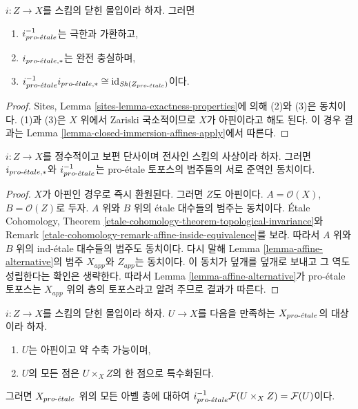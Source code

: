 \begin{lemma}
\label{lemma-closed-immersion}
$i : Z \to X$를 스킴의 닫힌 몰입이라 하자. 그러면
\begin{enumerate}
\item $i_{pro\text{-}\acute{e}tale}^{-1}$는 극한과 가환하고,
\item $i_{{pro\text{-}\acute{e}tale}, *}$는 완전 충실하며,
\item $i_{pro\text{-}\acute{e}tale}^{-1}i_{{pro\text{-}\acute{e}tale}, *} \cong
\text{id}_{\mathop{\mathit{Sh}}\nolimits(Z_{pro\text{-}\acute{e}tale})}$이다.
\end{enumerate}
\end{lemma}

\begin{proof}
Sites, Lemma \ref{sites-lemma-exactness-properties}에 의해 (2)와 (3)은
동치이다. (1)과 (3)은 $X$ 위에서 Zariski 국소적이므로 $X$가
아핀이라고 해도 된다. 이 경우 결과는 Lemma
\ref{lemma-closed-immersion-affines-apply}에서 따른다.
\end{proof}

\begin{lemma}
\label{lemma-thickening}
$i : Z \to X$를 정수적이고 보편 단사이며 전사인 스킴의 사상이라
하자. 그러면 $i_{{pro\text{-}\acute{e}tale}, *}$와 $i_{pro\text{-}\acute{e}tale}^{-1}$는 pro-\'etale
토포스의 범주들의 서로 준역인 동치이다.
\end{lemma}

\begin{proof}
$X$가 아핀인 경우로 즉시 환원된다. 그러면 $Z$도 아핀이다.
$A = \mathcal{O}(X)$, $B = \mathcal{O}(Z)$로 두자. $A$ 위와 $B$ 위의
\'etale 대수들의 범주는 동치이다. \'Etale Cohomology, Theorem
\ref{etale-cohomology-theorem-topological-invariance}와 Remark
\ref{etale-cohomology-remark-affine-inside-equivalence}를 보라.
따라서 $A$ 위와 $B$ 위의 ind-\'etale 대수들의 범주도 동치이다.
다시 말해 Lemma \ref{lemma-affine-alternative}의 범주 $X_{app}$와
$Z_{app}$는 동치이다. 이 동치가 덮개를 덮개로 보내고 그 역도
성립한다는 확인은 생략한다. 따라서 Lemma
\ref{lemma-affine-alternative}가 pro-\'etale 토포스는 $X_{app}$ 위의
층의 토포스라고 알려 주므로 결과가 따른다.
\end{proof}

\begin{lemma}
\label{lemma-compute-i-star}
$i : Z \to X$를 스킴의 닫힌 몰입이라 하자.
$U \to X$를 다음을 만족하는 $X_{pro\text{-}\acute{e}tale}$의 대상이라 하자.
\begin{enumerate}
\item $U$는 아핀이고 약 수축 가능이며,
\item $U$의 모든 점은 $U \times_X Z$의 한 점으로 특수화된다.
\end{enumerate}
그러면 $X_{pro\text{-}\acute{e}tale}$ 위의 모든 아벨 층에 대하여
$i_{pro\text{-}\acute{e}tale}^{-1}\mathcal{F}(U \times_X Z) = \mathcal{F}(U)$이다.
\end{lemma}

